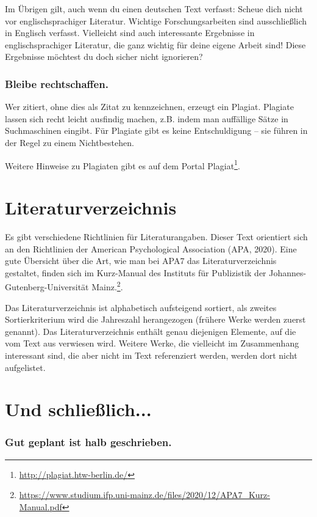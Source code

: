 \documentclass{../cssheet}
\begin{document}
Im Übrigen gilt, auch wenn du einen deutschen Text verfasst: Scheue dich
nicht vor englischsprachiger Literatur. Wichtige Forschungsarbeiten sind
ausschließlich in Englisch verfasst. Vielleicht sind auch interessante
Ergebnisse in englischsprachiger Literatur, die ganz wichtig für deine
eigene Arbeit sind! Diese Ergebnisse möchtest du doch sicher nicht
ignorieren?

\subsubsection*{Bleibe rechtschaffen.}

Wer zitiert, ohne dies als Zitat zu kennzeichnen, erzeugt ein Plagiat.
Plagiate lassen sich recht leicht ausfindig machen, z.B. indem man
auffällige Sätze in Suchmaschinen eingibt. Für Plagiate gibt es keine
Entschuldigung -- sie führen in der Regel zu einem Nichtbestehen.

Weitere Hinweise zu Plagiaten gibt es auf dem Portal Plagiat\footnote{\url{http://plagiat.htw-berlin.de/}}.

\section{Literaturverzeichnis}

Es gibt verschiedene Richtlinien für Literaturangaben. Dieser Text
orientiert sich an den Richtlinien der American Psychological
Association (APA, 2020). Eine gute Übersicht über die Art, wie man bei APA7 das Literaturverzeichnis gestaltet, finden sich im Kurz-Manual des Instituts für Publizistik der Johannes-Gutenberg-Universität Mainz.\footnote{\url{https://www.studium.ifp.uni-mainz.de/files/2020/12/APA7_Kurz-Manual.pdf}}.

Das Literaturverzeichnis ist alphabetisch aufsteigend sortiert, als
zweites Sortierkriterium wird die Jahreszahl herangezogen (frühere Werke
werden zuerst genannt). Das Literaturverzeichnis enthält genau
diejenigen Elemente, auf die vom Text aus verwiesen wird. Weitere Werke,
die vielleicht im Zusammenhang interessant sind, die aber nicht im Text
referenziert werden, werden dort nicht aufgelistet.


\section{Und schließlich...}

\subsubsection*{Gut geplant ist halb geschrieben.}
\end{document}
